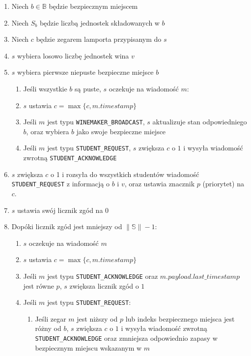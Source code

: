 \documentclass[12pt, a4paper, oneside]{article}
\begin{document}
\begin{enumerate}
    \item Niech $ b \in \mathbb{B} $ będzie bezpiecznym miejscem
    \item Niech $ \mathit{S}_b $ będzie liczbą jednostek składowanych w $ b $
    \item Niech $ c $ będzie zegarem lamporta przypisanym do $ s $
    \item\label{alg:stu:demand} $ s $ wybiera losowo liczbę jednostek wina $ v $
    \item\label{alg:stu:safehouse} $ s $ wybiera pierwsze niepuste bezpieczne miejsce $ b $
    \begin{enumerate}
        \item Jeśli wszystkie $ b $ są puste, $ s $ oczekuje na wiadomość $ m $:
        \item $ s $ ustawia $ c = \max\{c, m.timestamp\} $
        \item Jeśli $ m $ jest typu \texttt{WINEMAKER\_BROADCAST}, $ s $ aktualizuje stan odpowiedniego $ b $, oraz wybiera $ b $ jako swoje bezpieczne miejsce
        \item Jeśli $ m $ jest typu \texttt{STUDENT\_REQUEST}, $ s $ zwiększa $ c $ o $ 1 $ i wysyła wiadomość zwrotną \texttt{STUDENT\_ACKNOWLEDGE} 
    \end{enumerate}
    \item $ s $ zwiększa $ c $ o 1 i rozsyła do wszystkich studentów wiadomość \texttt{STUDENT\_REQUEST} z informacją o $ b $ i $ v $, oraz ustawia znacznik $ p $ (priorytet) na $ c $.
    \item $ s $ ustawia swój licznik zgód na $ 0 $
    \item Dopóki licznik zgód jest mniejszy od $ \|\mathbb{S}\| - 1 $:
    \begin{enumerate}
        \item $ s $ oczekuje na wiadomość $ m $
        \item $ s $ ustawia $ c = \max\{c, m.timestamp\} $
        \item Jeśli $ m $ jest typu \texttt {STUDENT\_ACKNOWLEDGE} oraz $ m.payload.last\_timestamp $ jest równe $ p $, $ s $ zwiększa licznik zgód o $ 1 $
        \item Jeśli $ m $ jest typu \texttt{STUDENT\_REQUEST}:
            \begin{enumerate}
                \item Jeśli zegar $ m $ jest niższy od $ p $ lub indeks bezpiecznego miejsca jest różny od $ b $, $ s $ zwiększa $ c $ o $ 1 $ i wysyła wiadomość zwrotną \texttt{STUDENT\_ACKNOWLEDGE} oraz zmniejsza odpowiednio zapasy w bezpiecznym miejscu wskazanym w $ m $ 

\end{enumerate}
\end{enumerate}
\end{enumerate}
\end{document}
